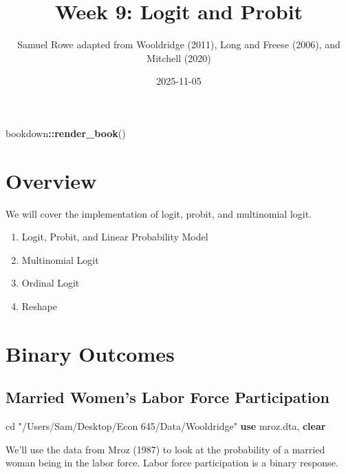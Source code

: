 \documentclass[
]{book}
\title{Week 9: Logit and Probit}
\author{Samuel Rowe adapted from Wooldridge (2011), Long and Freese (2006), and Mitchell (2020)}
\date{2025-11-05}
\newenvironment{Shaded}{\begin{snugshade}}{\end{snugshade}}
\newcommand{\FunctionTok}[1]{\textcolor[rgb]{0.13,0.29,0.53}{\textbf{#1}}}
\newcommand{\KeywordTok}[1]{\textcolor[rgb]{0.13,0.29,0.53}{\textbf{#1}}}
\newcommand{\NormalTok}[1]{#1}
\newcommand{\SpecialCharTok}[1]{\textcolor[rgb]{0.81,0.36,0.00}{\textbf{#1}}}
\newcommand{\StringTok}[1]{\textcolor[rgb]{0.31,0.60,0.02}{#1}}
\providecommand{\tightlist}{%
  \setlength{\itemsep}{0pt}\setlength{\parskip}{0pt}}
\begin{document}
\maketitle

{
\setcounter{tocdepth}{1}
\tableofcontents
}
\begin{Shaded}
\begin{Highlighting}[]
\NormalTok{bookdown}\SpecialCharTok{::}\FunctionTok{render\_book}\NormalTok{()}
\end{Highlighting}
\end{Shaded}

\chapter*{Overview}\label{overview}

We will cover the implementation of logit, probit, and multinomial logit.

\begin{enumerate}
\def\labelenumi{\arabic{enumi}.}
\tightlist
\item
  Logit, Probit, and Linear Probability Model
\item
  Multinomial Logit
\item
  Ordinal Logit
\item
  Reshape
\end{enumerate}

\chapter{Binary Outcomes}\label{binary-outcomes}

\section*{Married Women's Labor Force Participation}\label{married-womens-labor-force-participation}

\begin{Shaded}
\begin{Highlighting}[]
\NormalTok{cd }\StringTok{"/Users/Sam/Desktop/Econ 645/Data/Wooldridge"}
\KeywordTok{use}\NormalTok{ mroz.dta, }\KeywordTok{clear}
\end{Highlighting}
\end{Shaded}

We'll use the data from Mroz (1987) to look at the probability of a married woman being in the labor force. Labor force participation is a binary response.
\end{document}
